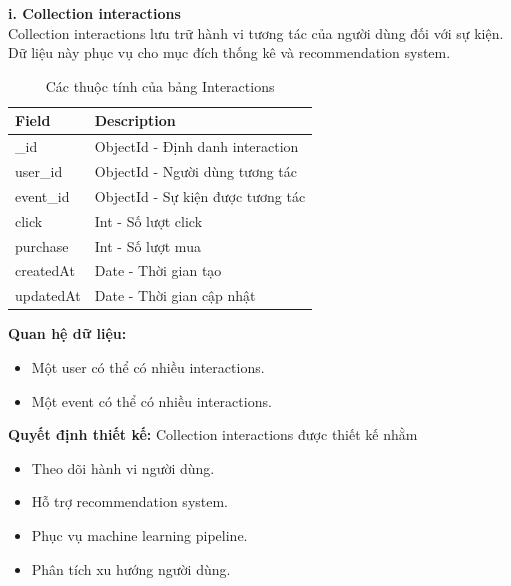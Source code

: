 \textbf{i. Collection interactions}\\
Collection interactions lưu trữ hành vi tương tác của người dùng đối với sự kiện.\\
Dữ liệu này phục vụ cho mục đích thống kê và recommendation system.
\setlength{\LTleft}{0pt}
\setlength{\LTright}{0pt}
\begin{longtable}{|p{4cm}|p{11.2cm}|}
\caption{Các thuộc tính của bảng Interactions}\\[15pt]
\hline
\textbf{Field} & \textbf{Description} \\ \hline
\_id & ObjectId - Định danh interaction \\ \hline
user\_id & ObjectId - Người dùng tương tác \\ \hline
event\_id & ObjectId - Sự kiện được tương tác \\ \hline
click & Int - Số lượt click \\ \hline
purchase & Int - Số lượt mua \\ \hline
createdAt & Date - Thời gian tạo \\ \hline
updatedAt & Date - Thời gian cập nhật \\ \hline
\end{longtable}
\textbf{Quan hệ dữ liệu:}
\begin{itemize}
    \item[-] Một user có thể có nhiều interactions.
    \item[-] Một event có thể có nhiều interactions.
\end{itemize}
\textbf{Quyết định thiết kế:} Collection interactions được thiết kế nhằm
\begin{itemize}
    \item[-] Theo dõi hành vi người dùng.
    \item[-] Hỗ trợ recommendation system.
    \item[-] Phục vụ machine learning pipeline.
    \item[-] Phân tích xu hướng người dùng.
\end{itemize}

